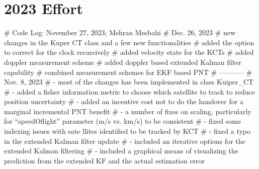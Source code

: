 \documentclass[11pt]{book}
\begin{document}
\newpage
\tableofcontents
% 
% 
% 





% 


\part{2023 Effort}


% 


# Code Log: November 27, 2023; Mehran Mesbahi
# Dec. 26, 2023
# new changes in the Kuper CT class and a few new functionalities
# added the option to correct for the clock recursively
# added velocity state for the KCTs
# added doppler measurement scheme
# added doppler based extended Kalman filter capability 
# combined measurement schemes for EKF based PNT
# -----------
# Nov. 8, 2023
# - most of the changes has been implemented in class Kuiper_CT 
# - added a fisher information metric to choose which satellite to track to reduce position uncertainty 
# - added an incentive cost not to do the handover for a marginal incremental PNT benefit 
# - a number of fixes on scaling, particularly for ``speedOflight'' parameter (m/s vs. km/s) to be consistent 
# - fixed some indexing issues with sate llites identified to be tracked by KCT
# - fixed a typo in the extended Kalman filter update
# - included an iterative options for the extended Kalman filtering
# - included a graphical means of visualizing the prediction from the extended KF and the actual estimation error
\end{document}
